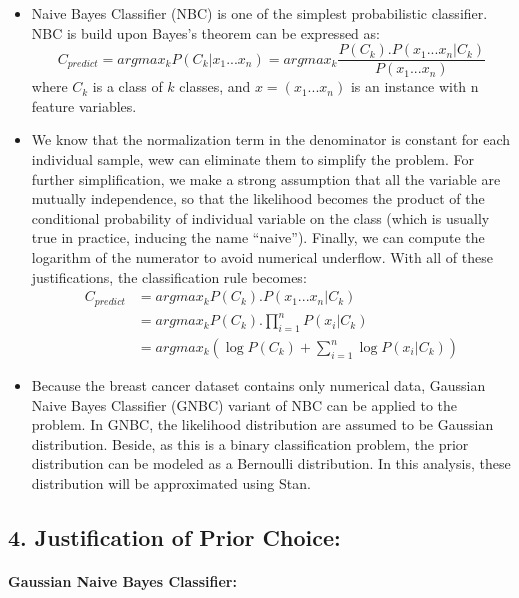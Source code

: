 \documentclass[
]{article}
\providecommand{\tightlist}{%
  \setlength{\itemsep}{0pt}\setlength{\parskip}{0pt}}
\begin{document}
\begin{itemize}
\tightlist
\item
  Naive Bayes Classifier (NBC) is one of the simplest probabilistic
  classifier. NBC is build upon Bayes's theorem can be expressed as:
  \[ C_{predict} = argmax_kP(C_k|x_1...x_n) = argmax_k\frac{P(C_k).P(x_1...x_n|C_k)}{P(x_1...x_n)} \]
  where \(C_k\) is a class of \(k\) classes, and \(x = (x_1...x_n)\) is
  an instance with n feature variables.\\
\item
  We know that the normalization term in the denominator is constant for
  each individual sample, wew can eliminate them to simplify the
  problem. For further simplification, we make a strong assumption that
  all the variable are mutually independence, so that the likelihood
  becomes the product of the conditional probability of individual
  variable on the class (which is usually true in practice, inducing the
  name ``naive''). Finally, we can compute the logarithm of the
  numerator to avoid numerical underflow. With all of these
  justifications, the classification rule becomes:\\
  \[ \begin{equation} 
  \begin{split}
  C_{predict} &= argmax_kP(C_k).P(x_1...x_n|C_k) \\ 
            &= argmax_kP(C_k).\prod_{i=1}^{n}P(x_i|C_k) \\
            &= argmax_k(\log{P(C_k)}+\sum_{i=1}^{n}\log{P(x_i|C_k)})
  \end{split} 
  \end{equation} \]
\item
  Because the breast cancer dataset contains only numerical data,
  Gaussian Naive Bayes Classifier (GNBC) variant of NBC can be applied
  to the problem. In GNBC, the likelihood distribution are assumed to be
  Gaussian distribution. Beside, as this is a binary classification
  problem, the prior distribution can be modeled as a Bernoulli
  distribution. In this analysis, these distribution will be
  approximated using Stan.
\end{itemize}

\hypertarget{justification-of-prior-choice}{%
\subsection{4. Justification of Prior
Choice:}\label{justification-of-prior-choice}}

\hypertarget{gaussian-naive-bayes-classifier-1}{%
\paragraph{Gaussian Naive Bayes
Classifier:}\label{gaussian-naive-bayes-classifier-1}}
\end{document}
